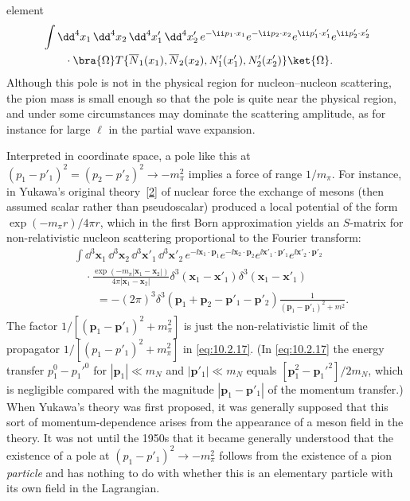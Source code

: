 
element
\begin{align*}
&\int \dd^4x_1\,\dd^4x_2\,\dd^4x'_1\,\dd^4x'_2\,
e^{-\ii p_1\cdot x_1}e^{-\ii p_2\cdot x_2}
e^{\ii p'_1\cdot x'_1}e^{\ii p'_2\cdot x'_2}
\\
&\qquad\cdot
\bra{\Omega}T\{\overline N_1(x_1),\overline N_2(x_2),
N'_1(x'_1),N'_2(x'_2)\}\ket{\Omega}.
\end{align*}
Although this pole is not in the physical region for nucleon--nucleon
scattering, the pion mass is small enough so that the pole is quite near the
physical region, and under some circumstances may dominate the scattering
amplitude, as for instance for large $\ell$ in the partial wave expansion.

Interpreted in coordinate space, a pole like this at
$(p_1-p'_1)^2=(p_2-p'_2)^2\to-m_\pi^2$ implies a force of range $1/m_\pi$.
For instance, in Yukawa's original theory~\hyperref[ref:10.2]{[2]} of nuclear
force the exchange of mesons (then assumed scalar rather than pseudoscalar)
produced a local potential of the form $\exp(-m_\pi r)/4\pi r$, which in the
first Born approximation yields an $S$-matrix for non-relativistic nucleon
scattering proportional to the Fourier transform:
\begin{align*}
&\int \dd^3\mathbf x_1\,\dd^3\mathbf x_2\,\dd^3\mathbf x'_1\,\dd^3\mathbf x'_2\,
e^{-\ii\mathbf x_1\cdot\mathbf p_1}e^{-\ii\mathbf x_2\cdot\mathbf p_2}
e^{\ii\mathbf x'_1\cdot\mathbf p'_1}e^{\ii\mathbf x'_2\cdot\mathbf p'_2}
\\
&\quad\cdot
\frac{\exp(-m_\pi|\mathbf x_1-\mathbf x_2|)}
{4\pi|\mathbf x_1-\mathbf x_2|}
\delta^3(\mathbf x_1-\mathbf x'_1)\delta^3(\mathbf x_1-\mathbf x'_1)
\\
&\qquad=-(2\pi)^3\delta^3(\mathbf p_1+\mathbf p_2-
\mathbf p'_1-\mathbf p'_2)\frac{1}{(\mathbf p_1-\mathbf p'_1)^2+m^2}.
\end{align*}
The factor $1/[(\mathbf p_1-\mathbf p'_1)^2+m_\pi^2]$ is just the
non-relativistic limit of the propagator
$1/[(p_1-p'_1)^2+m_\pi^2]$ in \eqref{eq:10.2.17}. (In \eqref{eq:10.2.17}
the energy transfer $p_1^0-p_1'^0$ for $|\mathbf p_1|\ll m_N$ and
$|\mathbf p'_1|\ll m_N$ equals
$[\mathbf p_1^2-\mathbf p_1'^2]/2m_N$, which is negligible compared with the
magnitude $|\mathbf p_1-\mathbf p'_1|$ of the momentum transfer.) When
Yukawa's theory was first proposed, it was generally supposed that this sort
of momentum-dependence arises from the appearance of a meson field in the
theory. It was not until the 1950s that it became generally understood that
the existence of a pole at $(p_1-p'_1)^2\to-m_\pi^2$ follows from the
existence of a pion \emph{particle} and has nothing to do with whether this is
an elementary particle with its own field in the Lagrangian.

